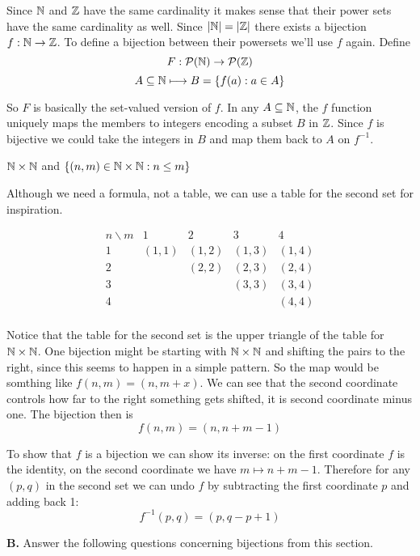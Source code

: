 \documentclass{article}
\begin{document}
Since $\mathbb{N}$ and $\mathbb{Z}$ have the same cardinality it makes sense that their power sets have the same cardinality as well. Since $|\mathbb{N}| = |\mathbb{Z}|$ there exists a bijection $f: \mathbb{N} \to \mathbb{Z}$. To define a bijection between their powersets we'll use $f$ again. Define
$$F: \mathcal{P}(\mathbb{N}) \to \mathcal{P}(\mathbb{Z})$$
$$ A \subseteq \mathbb{N} \longmapsto B = \{f(a): a \in A\}$$

So $F$ is basically the set-valued version of $f$. In any $A \subseteq \mathbb{N}$, the $f$ function uniquely maps the members to integers encoding a subset $B$ in $\mathbb{Z}$. Since $f$ is bijective we could take the integers in $B$ and map them back to $A$ on $f^{-1}$.

\begin{problem}
$\mathbb{N} \times \mathbb{N}$ and $\{(n, m) \in \mathbb{N} \times \mathbb{N}: n \leq m\}$
\end{problem}

Although we need a formula, not a table, we can use a table for the second set for inspiration.

$$\begin{array}{c|cccc}
    n \backslash m & 1     & 2     & 3     & 4     \\
    \hline
    1              & (1,1) & (1,2) & (1,3) & (1,4) \\
    2              &       & (2,2) & (2,3) & (2,4) \\
    3              &       &       & (3,3) & (3,4) \\
    4              &       &       &       & (4,4) \\
  \end{array}$$

Notice that the table for the second set is the upper triangle of the table for $\mathbb{N} \times \mathbb{N}$. One bijection might be starting with $\mathbb{N} \times \mathbb{N}$ and shifting the pairs to the right, since this seems to happen in a simple pattern. So the map would be somthing like $f(n, m) = (n, m + x)$. We can see that the second coordinate controls how far to the right something gets shifted, it is second coordinate minus one. The bijection then is
$$f(n, m) = (n, n + m - 1)$$

To show that $f$ is a bijection we can show its inverse: on the first coordinate $f$ is the identity, on the second coordinate we have $m \mapsto n + m - 1$. Therefore for any $(p, q)$ in the second set we can undo $f$ by subtracting the first coordinate $p$ and adding back 1:
$$f^{-1}(p, q) = (p, q - p + 1)$$

\textbf{B.} Answer the following questions concerning bijections from this section.
\end{document}
